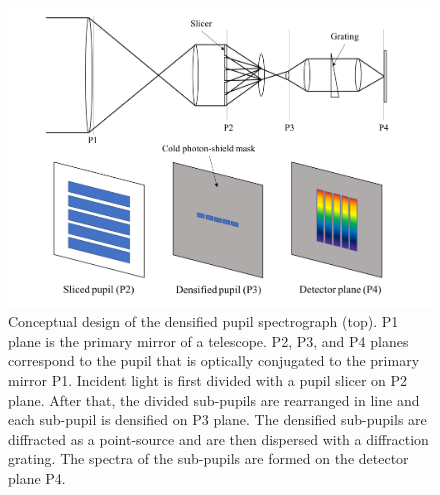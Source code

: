 \documentclass{aastex62}
\begin{document}
\begin{figure}[H]
\begin{center}
\includegraphics[width=12cm]{spectrograph.pdf}
\caption{Conceptual design of the densified pupil spectrograph (top). P1 plane is the primary mirror of a telescope. P2, P3, and P4 planes correspond to the pupil that is optically conjugated to the primary mirror P1. Incident light is first divided with a pupil slicer on P2 plane. After that, the divided sub-pupils are rearranged in line and each sub-pupil is densified on P3 plane. The densified sub-pupils are diffracted as a point-source and are then dispersed with a diffraction grating. The spectra of the sub-pupils are formed on the detector plane P4. \label{fig:spectrograph}}
\end{center}
\end{figure}
\end{document}
